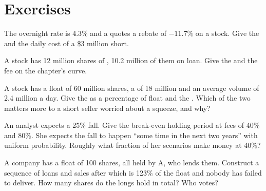 \section{Exercises}

\begin{exercise}[$\star$]\label{exo:m1:stock-loan-and-short-selling:1}
The overnight rate is 4.3\% and a  quotes a rebate of $-11.7\%$ on
a stock. Give the  and the daily cost of a \$3 million short.
\end{exercise}

\begin{exercise}[$\star$]\label{exo:m1:stock-loan-and-short-selling:2}
A stock has 12 million shares of , 10.2 million of them on
loan. Give the  and the fee on the chapter's curve.
\end{exercise}

\begin{exercise}[$\star$]\label{exo:m1:stock-loan-and-short-selling:3}
A stock has a float of 60 million shares, a  of 18 million and
an average volume of 2.4 million a day. Give the  as a
percentage of float and the . Which of the two matters more to
a short seller worried about a squeeze, and why?
\end{exercise}

\begin{exercise}[$\star\star$]\label{exo:m1:stock-loan-and-short-selling:4}
An analyst expects a 25\% fall. Give the break-even holding period at fees
of 40\% and 80\%. She expects the fall to happen ``some time in the next two
years'' with uniform probability. Roughly what fraction of her scenarios make
money at 40\%?
\end{exercise}

\begin{exercise}[$\star\star$]\label{exo:m1:stock-loan-and-short-selling:5}
A company has a float of 100 shares, all held by A, who lends them. Construct
a sequence of loans and sales after which  is 123\% of the
float and nobody has failed to deliver. How many shares do the longs hold in
total? Who votes?
\end{exercise}


